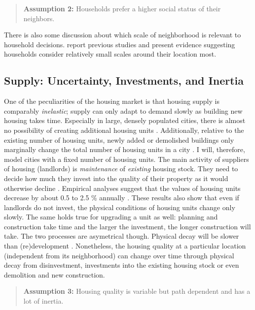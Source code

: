 \begin{quotation}
\textbf{Assumption 2:} Households prefer a higher social status of their neighbors.
\end{quotation}

There is also some discussion about which scale of neighborhood is relevant to household decisions. \citet{loganBirdsFeatherSocial2016} report previous studies and present evidence suggesting households consider relatively small scales around their location most. 


\subsection{Supply: Uncertainty, Investments, and Inertia}

One of the peculiarities of the housing market is that housing supply is comparably \textit{inelastic}; supply can only adapt to demand slowly as building new housing takes time. Especially in large, densely populated cities, there is almost no possibility of creating additional housing units \citep{baum-snowConstraintsCityNeighborhood2023}. Additionally, relative to the existing number of housing units, newly added or demolished buildings only marginally change the total number of housing units in a city \citep[1569]{whiteheadUrbanHousingMarkets1999}. I will, therefore, model cities with a fixed number of housing units. The main activity of suppliers of housing (landlords) is \textit{maintenance} of \textit{existing} housing stock. They need to decide how much they invest into the quality of their property as it would otherwise decline \citep[119]{bruecknerLecturesUrbanEconomics2011}. Empirical analyses suggest that the values of housing units decrease by about 0.5 to 2.5 \% annually \citep[1086]{rosenthalChangePersistenceEconomic2015}. These results also show that even if landlords do not invest, the physical conditions of housing units change only slowly. The same holds true for upgrading a unit as well: planning and construction take time and the larger the investment, the longer construction will take. The two processes are asymetrical though. Physical decay will be slower than (re)development \citep{glaeserUrbanDeclineDurable2005}. Nonetheless, the housing quality at a particular location (independent from its neighborhood) can change over time through physical decay from disinvestment, investments into the existing housing stock or even demolition and new construction.

\begin{quotation}
\textbf{Assumption 3:} Housing quality is variable but path dependent and has a lot of inertia.
\end{quotation}

